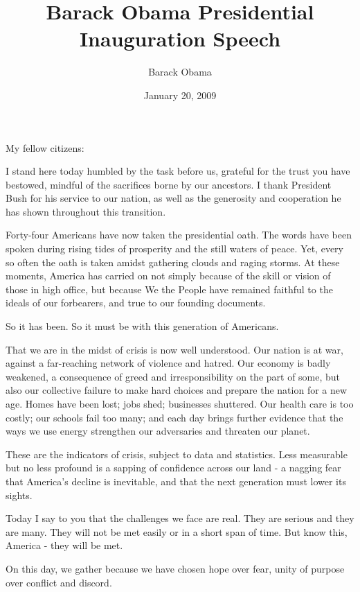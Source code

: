 \documentclass[12pt,a4paper,onecolumn]{article}
\title{Barack Obama Presidential Inauguration Speech}
\author{Barack Obama}
\begin{document}
\date{January 20, 2009}

\maketitle

\begin{sffamily}

My fellow citizens:

I stand here today humbled by the task before us, grateful for the trust you have bestowed, mindful
of the sacrifices borne by our ancestors. I thank President Bush for his service to our nation, as
well as the generosity and cooperation he has shown throughout this transition.

Forty-four Americans have now taken the presidential oath. The words have been spoken during rising
tides of prosperity and the still waters of peace. Yet, every so often the oath is taken amidst
gathering clouds and raging storms. At these moments, America has carried on not simply because of
the skill or vision of those in high office, but because We the People have remained faithful to the
ideals of our forbearers, and true to our founding documents.

So it has been. So it must be with this generation of Americans.

That we are in the midst of crisis is now well understood. Our nation is at war, against a
far-reaching network of violence and hatred. Our economy is badly weakened, a consequence of greed
and irresponsibility on the part of some, but also our collective failure to make hard choices and
prepare the nation for a new age. Homes have been lost; jobs shed; businesses shuttered. Our health
care is too costly; our schools fail too many; and each day brings further evidence that the ways we
use energy strengthen our adversaries and threaten our planet.

These are the indicators of crisis, subject to data and statistics. Less measurable but no less
profound is a sapping of confidence across our land - a nagging fear that America's decline is
inevitable, and that the next generation must lower its sights.

Today I say to you that the challenges we face are real. They are serious and they are many. They
will not be met easily or in a short span of time. But know this, America - they will be met.

On this day, we gather because we have chosen hope over fear, unity of purpose over conflict and
discord.


\end{sffamily}
\end{document}
